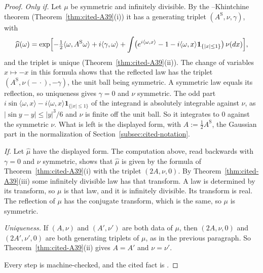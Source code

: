 \begin{proof}
\leanok
{}
\emph{Only if.} Let $\mu$ be symmetric and infinitely divisible. By the \Levy--Khintchine theorem
(Theorem~\ref{thm:cited-A39}(i)) it has a generating triplet $(A^{\mathrm S}, \nu, \gamma)$, with
\[
  \widehat\mu(\omega) = \exp\Bigl[-\tfrac12\langle\omega, A^{\mathrm S}\omega\rangle + i\langle\gamma, \omega\rangle
  + \int\bigl(e^{i\langle\omega, x\rangle} - 1 - i\langle\omega, x\rangle\mathbf 1_{\{|x| \le 1\}}\bigr)\,\nu(dx)\Bigr],
\]
and the triplet is unique (Theorem~\ref{thm:cited-A39}(ii)). The change of variables
$x \mapsto -x$ in this formula shows that the reflected law has the triplet
$(A^{\mathrm S}, \nu(-\,\cdot), -\gamma)$, the unit ball being symmetric. A symmetric law equals its
reflection, so uniqueness gives $\gamma = 0$ and $\nu$ symmetric. The odd part
$i\sin\langle\omega, x\rangle - i\langle\omega, x\rangle\mathbf 1_{\{|x| \le 1\}}$ of the integrand
is absolutely integrable against $\nu$, as $|\sin y - y| \le |y|^3/6$ and $\nu$ is finite off the
unit ball. So it integrates to $0$ against the symmetric $\nu$. What is left is the displayed form,
with $A := \tfrac12A^{\mathrm S}$, the Gaussian part in the normalization of
Section~\ref{subsec:cited-notation}.

\emph{If.} Let $\widehat\mu$ have the displayed form. The computation above, read backwards with
$\gamma = 0$ and $\nu$ symmetric, shows that $\widehat\mu$ is given by the formula of
Theorem~\ref{thm:cited-A39}(i) with the triplet $(2A, \nu, 0)$. By Theorem~\ref{thm:cited-A39}(iii)
some infinitely divisible law has that transform. A law is determined by its transform, so $\mu$ is
that law, and it is infinitely divisible. Its transform is real. The reflection of $\mu$ has the
conjugate transform, which is the same, so $\mu$ is symmetric.

\emph{Uniqueness.} If $(A, \nu)$ and $(A', \nu')$ are both data of $\mu$, then $(2A, \nu, 0)$ and
$(2A', \nu', 0)$ are both generating triplets of $\mu$, as in the previous paragraph. So
Theorem~\ref{thm:cited-A39}(ii) gives $A = A'$ and $\nu = \nu'$.

Every step is machine-checked, and the cited fact is .
\end{proof}

